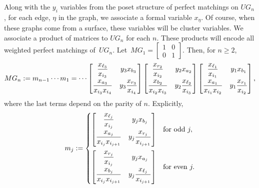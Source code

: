 \documentclass[pdftex]{sigma}%
\numberwithin{equation}{section}
\begin{document}
Along with the $y_i$ variables from the poset structure of perfect matchings on $UG_n$, for each edge, $\eta$ in the graph, we associate a formal variable $x_\eta$. Of course, when these graphs come from a surface, these variables will be cluster variables. We associate a product of matrices to $UG_n$ for each $n$. These products will encode all weighted perfect matchings of~$UG_n$. Let~$MG_1 = \left[\begin{smallmatrix} 1 &0 \\ 0 & 1 \end{smallmatrix}\right]$. Then, for $n \geq 2$,
\[
MG_n := m_{n-1}\cdots m_1 = \cdots \begin{bmatrix} \dfrac{x_{\ell_3}}{x_{i_3}} & y_3 x_{b_3} \vspace{1mm}\\ \dfrac{x_{a_3}}{x_{i_3}x_{i_4}} & y_3 \dfrac{x_{r_3}}{x_{i_4}} \end{bmatrix} \begin{bmatrix}\dfrac{x_{r_2}}{x_{i_2}} & y_2 x_{a_2} \vspace{1mm}\\ \dfrac{x_{b_2}}{x_{i_2}x_{i_3}} & y_2 \dfrac{x_{\ell_2}}{x_{i_3}} \end{bmatrix} \begin{bmatrix} \dfrac{x_{\ell_1}}{x_{i_1}} & y_1 x_{b_1} \vspace{1mm}\\ \dfrac{x_{a_1}}{x_{i_1}x_{i_2}} & y_1 \dfrac{x_{r_1}}{x_{i_2}} \end{bmatrix},
\]
where the last terms depend on the parity of $n$. Explicitly,
\begin{gather*}
 m_j := \begin{cases}
 \begin{bmatrix} \dfrac{x_{\ell_j}}{x_{i_j}} & y_jx_{b_j} \vspace{1mm}\\ \dfrac{x_{a_j}}{x_{i_j}x_{i_{j+1}}} & y_j\dfrac{x_{r_j}}{x_{i_{j+1}}} \end{bmatrix} & \text{for odd } j, \vspace{2mm} \\
\begin{bmatrix} \dfrac{x_{r_j}}{x_{i_j}} & y_jx_{a_j} \vspace{1mm}\\ \dfrac{x_{b_j}}{x_{i_j}x_{i_{j+1}}} & y_j\dfrac{x_{\ell_j}}{x_{i_{j+1}}} \end{bmatrix} & \text{for even }j.
 \end{cases}
\end{gather*}
\end{document}
